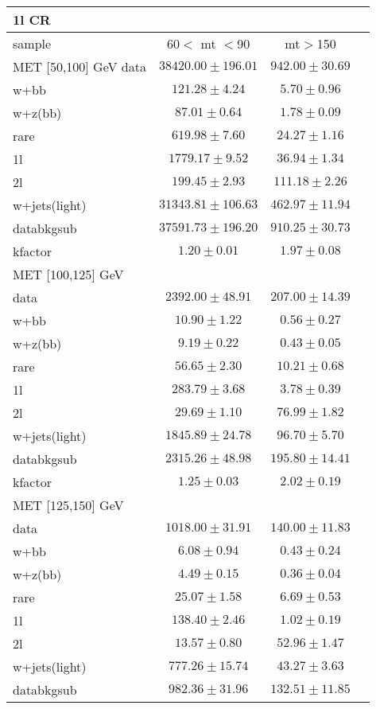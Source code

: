 \begin{table}
\begin{center}
\small
\begin{tabular}{lccc}
\hline
1l CR   & &\\
\hline
sample&60$<$ mt $<$90&mt$>$150\\
\hline
MET [50,100] GeV\hline
data&$38420.00\pm196.01$&$942.00\pm30.69$\\
\hline
w+bb&$121.28\pm4.24$&$5.70\pm0.96$\\
w+z(bb)&$87.01\pm0.64$&$1.78\pm0.09$\\
rare&$619.98\pm7.60$&$24.27\pm1.16$\\
1l&$1779.17\pm9.52$&$36.94\pm1.34$\\
2l&$199.45\pm2.93$&$111.18\pm2.26$\\
w+jets(light)&$31343.81\pm106.63$&$462.97\pm11.94$\\
\hline
databkgsub&$37591.73\pm196.20$&$910.25\pm30.73$\\
kfactor&$1.20\pm0.01$&$1.97\pm0.08$\\
\hline\hline
\hline
MET [100,125] GeV  & &\\
\hline
data&$2392.00\pm48.91$&$207.00\pm14.39$\\
\hline
w+bb&$10.90\pm1.22$&$0.56\pm0.27$\\
w+z(bb)&$9.19\pm0.22$&$0.43\pm0.05$\\
rare&$56.65\pm2.30$&$10.21\pm0.68$\\
1l&$283.79\pm3.68$&$3.78\pm0.39$\\
2l&$29.69\pm1.10$&$76.99\pm1.82$\\
w+jets(light)&$1845.89\pm24.78$&$96.70\pm5.70$\\
\hline
databkgsub&$2315.26\pm48.98$&$195.80\pm14.41$\\
kfactor&$1.25\pm0.03$&$2.02\pm0.19$\\
\hline\hline
\hline
MET [125,150] GeV  & &\\
\hline
data&$1018.00\pm31.91$&$140.00\pm11.83$\\
\hline
w+bb&$6.08\pm0.94$&$0.43\pm0.24$\\
w+z(bb)&$4.49\pm0.15$&$0.36\pm0.04$\\
rare&$25.07\pm1.58$&$6.69\pm0.53$\\
1l&$138.40\pm2.46$&$1.02\pm0.19$\\
2l&$13.57\pm0.80$&$52.96\pm1.47$\\
w+jets(light)&$777.26\pm15.74$&$43.27\pm3.63$\\
\hline
databkgsub&$982.36\pm31.96$&$132.51\pm11.85$\\

\end{tabular}
\end{center}
\end{table}

